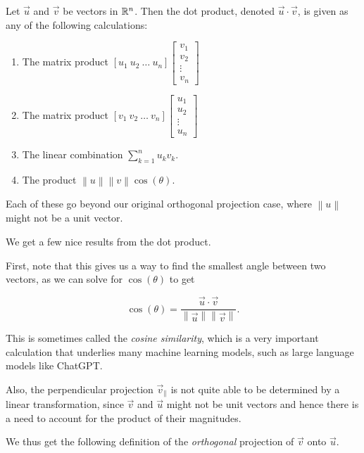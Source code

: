\documentclass{ximera}
\begin{document}
    \begin{theorem}
      Let $\vec{u}$ and $\vec{v}$ be vectors in $\mathbb{R}^n$. Then the dot product, denoted $\vec{u}\cdot\vec{v}$, is given as any of the following calculations:

      \begin{enumerate}
        \item The matrix product $[u_1\ u_2\ \ldots\ u_n]\begin{bmatrix}
        v_1\\v_2\\\vdots\\v_n
      \end{bmatrix}$
        \item The matrix product $[v_1\ v_2\ \ldots\ v_n]\begin{bmatrix}
        u_1\\u_2\\\vdots\\u_n
      \end{bmatrix}$
        \item The linear combination $\sum_{k=1}^nu_kv_k$.
        \item The product $\left\|u\right\|\left\|v\right\|\cos(\theta)$.
      \end{enumerate}
    \end{theorem}

    Each of these go beyond our original orthogonal projection case, where $\left\|u\right\|$ might not be a unit vector. 

    \begin{remark}
      We get a few nice results from the dot product. 

      First, note that this gives us a way to find the smallest angle between two vectors, as we can solve for $\cos(\theta)$ to get 

      $$\cos(\theta)=\frac{\vec{u}\cdot\vec{v}}{\left\|\vec{u}\right\|\left\|\vec{v}\right\|}.$$

      This is sometimes called the \emph{cosine similarity}, which is a very important calculation that underlies many machine learning models, such as large language models like ChatGPT.

      Also, the perpendicular projection $\vec{v}_\parallel$ is not quite able to be determined by a linear transformation, since $\vec{v}$ and $\vec{u}$ might not be unit vectors and hence there is a need to account for the product of their magnitudes. 

      We thus get the following definition of the \emph{orthogonal} projection of $\vec{v}$ onto $\vec{u}$.
    \end{remark}
\end{document}
